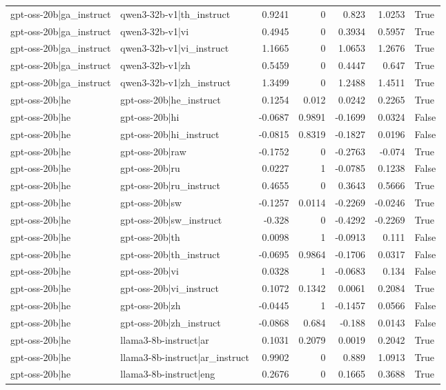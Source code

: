 \begin{table}
\begin{tabular}{l l r r r r l}
gpt-oss-20b|ga_instruct & qwen3-32b-v1|th_instruct & 0.9241 & 0 & 0.823 & 1.0253 & True \\
gpt-oss-20b|ga_instruct & qwen3-32b-v1|vi & 0.4945 & 0 & 0.3934 & 0.5957 & True \\
gpt-oss-20b|ga_instruct & qwen3-32b-v1|vi_instruct & 1.1665 & 0 & 1.0653 & 1.2676 & True \\
gpt-oss-20b|ga_instruct & qwen3-32b-v1|zh & 0.5459 & 0 & 0.4447 & 0.647 & True \\
gpt-oss-20b|ga_instruct & qwen3-32b-v1|zh_instruct & 1.3499 & 0 & 1.2488 & 1.4511 & True \\
gpt-oss-20b|he & gpt-oss-20b|he_instruct & 0.1254 & 0.012 & 0.0242 & 0.2265 & True \\
gpt-oss-20b|he & gpt-oss-20b|hi & -0.0687 & 0.9891 & -0.1699 & 0.0324 & False \\
gpt-oss-20b|he & gpt-oss-20b|hi_instruct & -0.0815 & 0.8319 & -0.1827 & 0.0196 & False \\
gpt-oss-20b|he & gpt-oss-20b|raw & -0.1752 & 0 & -0.2763 & -0.074 & True \\
gpt-oss-20b|he & gpt-oss-20b|ru & 0.0227 & 1 & -0.0785 & 0.1238 & False \\
gpt-oss-20b|he & gpt-oss-20b|ru_instruct & 0.4655 & 0 & 0.3643 & 0.5666 & True \\
gpt-oss-20b|he & gpt-oss-20b|sw & -0.1257 & 0.0114 & -0.2269 & -0.0246 & True \\
gpt-oss-20b|he & gpt-oss-20b|sw_instruct & -0.328 & 0 & -0.4292 & -0.2269 & True \\
gpt-oss-20b|he & gpt-oss-20b|th & 0.0098 & 1 & -0.0913 & 0.111 & False \\
gpt-oss-20b|he & gpt-oss-20b|th_instruct & -0.0695 & 0.9864 & -0.1706 & 0.0317 & False \\
gpt-oss-20b|he & gpt-oss-20b|vi & 0.0328 & 1 & -0.0683 & 0.134 & False \\
gpt-oss-20b|he & gpt-oss-20b|vi_instruct & 0.1072 & 0.1342 & 0.0061 & 0.2084 & True \\
gpt-oss-20b|he & gpt-oss-20b|zh & -0.0445 & 1 & -0.1457 & 0.0566 & False \\
gpt-oss-20b|he & gpt-oss-20b|zh_instruct & -0.0868 & 0.684 & -0.188 & 0.0143 & False \\
gpt-oss-20b|he & llama3-8b-instruct|ar & 0.1031 & 0.2079 & 0.0019 & 0.2042 & True \\
gpt-oss-20b|he & llama3-8b-instruct|ar_instruct & 0.9902 & 0 & 0.889 & 1.0913 & True \\
gpt-oss-20b|he & llama3-8b-instruct|eng & 0.2676 & 0 & 0.1665 & 0.3688 & True \\

\end{tabular}
\end{table}

